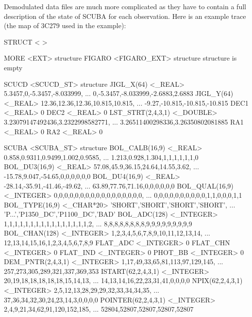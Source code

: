 \documentclass[twoside,11pt]{starlink}
\begin{document}
Demodulated data files are much more complicated as they have to contain a
full description of the state of SCUBA for each observation.
Here is an example trace (the map of 3C279 used in the example):
\begin{terminalv}

STRUCT  < >

   MORE           <EXT>           {structure}
      FIGARO         <FIGARO_EXT>    {structure}
         {structure is empty}

      SCUCD          <SCUCD_ST>      {structure}
         JIGL_X(64)     <_REAL>         5.3457,0,-5.3457,-8.033999,
                                        ... 0,-5.3457,-8.033999,-2.6883,2.6883
         JIGL_Y(64)     <_REAL>         12.36,12.36,12.36,10.815,10.815,
                                        ... -9.27,-10.815,-10.815,-10.815
         DEC1           <_REAL>         0
         DEC2           <_REAL>         0
         LST_STRT(2,4,3,1)  <_DOUBLE>   3.23079147492436,3.2322998582771,
                                        ... 3.26511400298336,3.26350802081885
         RA1            <_REAL>         0
         RA2            <_REAL>         0

      SCUBA          <SCUBA_ST>      {structure}
         BOL_CALB(16,9)  <_REAL>        0.858,0.9311,0.9499,1.002,0.9585,
                                        ... 1.213,0.928,1.304,1,1,1,1,1,1,0
         BOL_DU3(16,9)  <_REAL>         57.08,45.9,36.15,24.64,14.55,3.62,
                                        ... -15.78,9.047,-54.65,0,0,0,0,0,0
         BOL_DU4(16,9)  <_REAL>         -28.14,-35.91,-41.46,-49.62,
                                        ... 63.89,77.76,71.16,0,0,0,0,0,0
         BOL_QUAL(16,9)  <_INTEGER>     0,0,0,0,0,0,0,0,0,0,0,0,0,0,0,0,0,
                                        ... 0,0,0,0,0,0,0,0,0,0,1,1,0,0,0,1,1
         BOL_TYPE(16,9)  <_CHAR*20>     'SHORT','SHORT','SHORT','SHORT',
                                        ... 'P...','P1350_DC','P1100_DC','BAD'
         BOL_ADC(128)   <_INTEGER>      1,1,1,1,1,1,1,1,1,1,1,1,1,1,1,1,2,
                                        ... 8,8,8,8,8,8,8,8,9,9,9,9,9,9,9,9,9
         BOL_CHAN(128)  <_INTEGER>      1,2,3,4,5,6,7,8,9,10,11,12,13,14,
                                        ... 12,13,14,15,16,1,2,3,4,5,6,7,8,9
         FLAT_ADC       <_INTEGER>      0
         FLAT_CHN       <_INTEGER>      0
         FLAT_IND       <_INTEGER>      0
         PHOT_BB        <_INTEGER>      0
         DEM_PNTR(2,4,3,1)  <_INTEGER>   1,17,49,33,65,81,113,97,129,145,
                                         ... 257,273,305,289,321,337,369,353
         ISTART(62,2,4,3,1)  <_INTEGER>   20,19,18,18,18,18,18,15,14,13,
                                          ... 14,13,14,16,22,23,31,41,0,0,0,0
         NPIX(62,2,4,3,1)  <_INTEGER>   2,5,12,13,28,29,29,32,33,34,34,35,
                                        ... 37,36,34,32,30,24,23,14,3,0,0,0,0
         POINTER(62,2,4,3,1)  <_INTEGER>   2,4,9,21,34,62,91,120,152,185,
                                           ... 52804,52807,52807,52807,52807


\end{terminalv}
\end{document}
